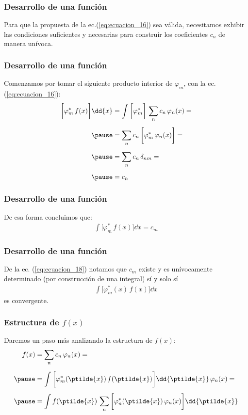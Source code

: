 \begin{frame}
\frametitle{Desarrollo de una función}
Para que la propuesta de la ec.(\ref{eq:ecuacion_16}) sea válida, necesitamos exhibir las condiciones suficientes y necesarias para construir los coeficientes $c_{n}$ de manera unívoca.
\end{frame}
\begin{frame}
\frametitle{Desarrollo de una función}
Comenzamos por tomar el siguiente producto interior de $\varphi_{m}$, con la ec.(\ref{eq:ecuacion_16}):
\fontsize{12}{12}\selectfont
\begin{eqnarray}
\begin{aligned}
\bigg[ \varphi_{m}^{*} \, f(x) \bigg] \dd{x} &= \int \bigg[ \varphi_{m}^{*} \bigg] \, \sum_{n} c_{n} \, \varphi_{n} (x) = \\[0.5em] \pause
&= \sum_{n} c_{n} \, \bigg[ \varphi_{m}^{*} \, \varphi_{n} (x) \bigg] = \\[0.5em] \pause
&= \sum_{n} c_{n} \, \delta_{nm} = \\[0.5em] \pause
&= c_{n}
\end{aligned}
\label{eq:ecuacion_17}
\end{eqnarray}
\end{frame}
\begin{frame}
\frametitle{Desarrollo de una función}
De esa forma concluimos que:
\begin{align}
\int \bigg[ \varphi_{m}^{*} \, f(x) \bigg] \dd{x} = c_{m}
\label{eq:ecuacion_18}
\end{align}
\end{frame}
\begin{frame}
\frametitle{Desarrollo de una función}
De la ec. (\ref{eq:ecuacion_18}) notamos que $c_{m}$ existe y es unívocamente determinado (por construcción de una integral) sí y solo sí
\begin{align*}
\int \bigg[ \varphi_{m}^{*}(x) \, f(x) \bigg] \dd{x} 
\end{align*}
es convergente.
\end{frame}
\begin{frame}
\frametitle{Estructura de $f(x)$}
Daremos un paso más analizando la estructura de $f(x)$:
\begin{eqnarray}
\begin{aligned}
f(x) &= \sum_{n} c_{n} \, \varphi_{n}(x) = \\[0.5em] \pause
&= \int \bigg[ \varphi_{m}^{*}(\ptilde{x}) \, f(\ptilde{x}) \bigg] \dd{\ptilde{x}} \, \varphi_{n} (x) = \\[0.5em] \pause
&= \int f(\ptilde{x}) \, \sum_{n} \bigg[ \varphi_{n}^{*}(\ptilde{x}) \, \varphi_{n}(x) \bigg] \dd{\ptilde{x}}
\end{aligned}
\label{eq:ecuacion_19}
\end{eqnarray}
\end{frame}
